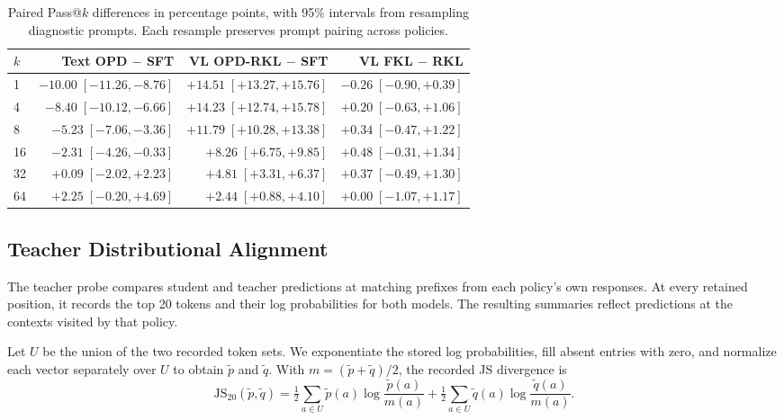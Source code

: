 \documentclass[]{jingdong}
\theoremstyle{plain}
\theoremstyle{definition}
\theoremstyle{remark}
\begin{document}
\begin{table}[H]
\centering
\footnotesize
\caption{Paired Pass@$k$ differences in percentage points, with 95\% intervals from resampling diagnostic prompts. Each resample preserves prompt pairing across policies.}
\label{tab:passk_bootstrap}
\setlength{\tabcolsep}{3pt}
\renewcommand{\arraystretch}{1.08}
\begin{tabular*}{\linewidth}{@{\extracolsep{\fill}}lrrr@{}}
\toprule
$k$ & \shortstack{Text\\OPD $-$ SFT} & \shortstack{VL\\OPD-RKL $-$ SFT} & \shortstack{VL\\FKL $-$ RKL} \\
\midrule
1 & $-10.00\;[-11.26, -8.76]$ & $+14.51\;[+13.27, +15.76]$ & $-0.26\;[-0.90, +0.39]$ \\
4 & $-8.40\;[-10.12, -6.66]$ & $+14.23\;[+12.74, +15.78]$ & $+0.20\;[-0.63, +1.06]$ \\
8 & $-5.23\;[-7.06, -3.36]$ & $+11.79\;[+10.28, +13.38]$ & $+0.34\;[-0.47, +1.22]$ \\
16 & $-2.31\;[-4.26, -0.33]$ & $+8.26\;[+6.75, +9.85]$ & $+0.48\;[-0.31, +1.34]$ \\
32 & $+0.09\;[-2.02, +2.23]$ & $+4.81\;[+3.31, +6.37]$ & $+0.37\;[-0.49, +1.30]$ \\
64 & $+2.25\;[-0.20, +4.69]$ & $+2.44\;[+0.88, +4.10]$ & $+0.00\;[-1.07, +1.17]$ \\
\bottomrule
\end{tabular*}
\end{table}


\subsection{Teacher Distributional Alignment}
\label{app:local-definitions}

The teacher probe compares student and teacher predictions at matching prefixes from each policy's own responses. At every retained position, it records the top 20 tokens and their log probabilities for both models. The resulting summaries reflect predictions at the contexts visited by that policy.

Let $U$ be the union of the two recorded token sets. We exponentiate the stored log probabilities, fill absent entries with zero, and normalize each vector separately over $U$ to obtain $\tilde p$ and $\tilde q$. With $m=(\tilde p+\tilde q)/2$, the recorded JS divergence is
\begin{equation}
\label{eq:js20}
\mathrm{JS}_{20}(\tilde p,\tilde q)
=\tfrac12\sum_{a\in U}\tilde p(a)\log\frac{\tilde p(a)}{m(a)}
+\tfrac12\sum_{a\in U}\tilde q(a)\log\frac{\tilde q(a)}{m(a)}.
\end{equation}
\end{document}
